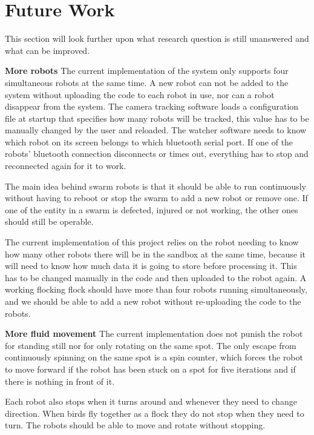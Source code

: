 \section{Future Work}
\label{sec:futureWork}

This section will look further upon what research question is still unanswered and what can be improved.

\textbf{More robots}
The current implementation of the system only supports four simultaneous robots at the same time. A new robot can not be added to the system without uploading the code to each robot in use, nor can a robot disappear from the system. The camera tracking software loads a configuration file at startup that specifies how many robots will be tracked, this value has to be manually changed by the user and reloaded.
The watcher software needs to know which robot on its screen belongs to which bluetooth serial port. If one of the robots' bluetooth connection disconnects or times out, everything has to stop and reconnected again for it to work.

The main idea behind swarm robots is that it should be able to run continuously without having to reboot or stop the swarm to add a new robot or remove one. If one of the entity in a swarm is defected, injured or not working, the other ones should still be operable.

The current implementation of this project relies on the robot needing to know how many other robots there will be in the sandbox at the same time, because it will need to know how much data it is going to store before processing it. This has to be changed manually in the code and then uploaded to the robot again.
A working flocking flock should have more than four robots running simultaneously, and we should be able to add a new robot without re-uploading the code to the robots.

\textbf{More fluid movement} %
The current implementation does not punish the robot for standing still nor for only rotating on the same spot. The only escape from continuously spinning on the same spot is a spin counter, which forces the robot to move forward if the robot has been stuck on a spot for five iterations and if there is nothing in front of it. 

Each robot also stops when it turns around and whenever they need to change direction. When birds fly together as a flock they do not stop when they need to turn. The robots should be able to move and rotate without stopping.




